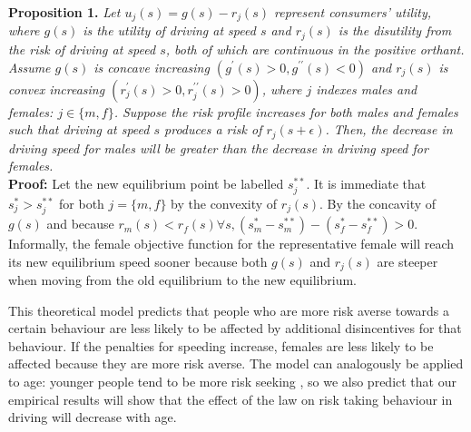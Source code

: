 \textbf{Proposition 1.} {\it 
Let $u_j (s) = g(s) - r_j (s)$ represent consumers' utility, 
where $g(s)$ is the utility of driving at speed $s$ 
and $r_j (s)$ is the disutility from the risk of driving at speed $s$, 
both of which are continuous in the positive orthant. 
%
Assume $g(s)$ is concave increasing $(g^{\prime} (s)>0, 
g^{\prime\prime} (s)<0)$ 
and $r_j (s)$ is convex increasing $(r_j^{\prime} (s)>0, r_j^{\prime\prime} (s)>0)$, 
where $j$ indexes males and females: $j \in \{m,f\}$. 
%
Suppose the risk profile increases 
for both males and females such that driving at speed $s$ 
produces a risk of $r_j (s+\epsilon)$. 
%
Then, the decrease in driving speed for males will be greater 
than the decrease in driving speed for females.} \\

\textbf{Proof:} Let the new equilibrium point be labelled $s_j^{**}$. 
It is immediate that $s_j^*>s_j^{**}$ 
for both $j=\{m,f\}$ by the convexity of $r_j (s)$. 
By the concavity of $g(s)$ 
and because 
$r_m (s)<r_f (s)  \forall s, 
(s_m^*-s_m^{**} ) - (s_f^*-s_f^{**})>0$. \qedsymbol \\



Informally, the female objective function for the representative female 
will reach its new equilibrium speed sooner 
because both $g(s)$ and $r_j (s)$ are steeper 
when moving from the old equilibrium to the new equilibrium.

This theoretical model predicts that people who are more risk averse 
towards a certain behaviour are less likely to be affected 
by additional disincentives for that behaviour. 
If the penalties for speeding increase, 
females are less likely to be affected because they are more risk averse. 
The model can analogously be applied to age: 
younger people tend to be more risk seeking 
\citep[e.g.][]{gongyang2012}, 
so we also predict that our empirical results will show that the effect of the law 
on risk taking behaviour in driving will decrease with age.



